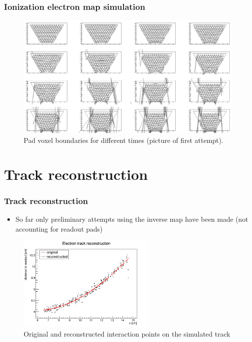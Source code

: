 \documentclass{beamer}
\begin{document}
	\begin{frame}
		\frametitle{Ionization electron map simulation}
		\begin{figure}
			\centering
			\includegraphics[height=0.68\textheight]{../images/pads_dist.png}
			\caption{Pad voxel boundaries for different times (picture of first attempt).}
		\end{figure}
	\end{frame}


	\section{Track reconstruction}
	\begin{frame}
		\frametitle{Track reconstruction}
		\begin{itemize}
			\item So far only preliminary attempts using the inverse map have been made (not accounting for readout pads)
		\end{itemize}
		\begin{figure}
			\centering
			\includegraphics[width=0.6\textwidth]{../images/reco_track.png}
			\caption{Original and reconstructed interaction points on the simulated track}
		\end{figure}
	\end{frame}
\end{document}
